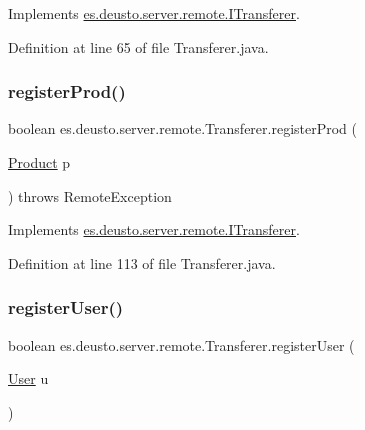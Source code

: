 Implements \hyperlink{interfacees_1_1deusto_1_1server_1_1remote_1_1_i_transferer_ab767521556fc61bc5a39306080f00cae}{es.\+deusto.\+server.\+remote.\+I\+Transferer}.



Definition at line 65 of file Transferer.\+java.

\mbox{\label{classes_1_1deusto_1_1server_1_1remote_1_1_transferer_a64c1f3b57b74106df83335b124937afe}} 
\subsubsection{\texorpdfstring{register\+Prod()}{registerProd()}}
{\footnotesize\ttfamily boolean es.\+deusto.\+server.\+remote.\+Transferer.\+register\+Prod (\begin{DoxyParamCaption}\item[{\hyperlink{classes_1_1deusto_1_1server_1_1db_1_1data_1_1_product}{Product}}]{p }\end{DoxyParamCaption}) throws Remote\+Exception}



Implements \hyperlink{interfacees_1_1deusto_1_1server_1_1remote_1_1_i_transferer_a06629c7021aae4d2ce1a449726102ded}{es.\+deusto.\+server.\+remote.\+I\+Transferer}.



Definition at line 113 of file Transferer.\+java.

\mbox{\label{classes_1_1deusto_1_1server_1_1remote_1_1_transferer_a80e2dd7db595bdd8d39969e5d0e8ae7b}} 
\subsubsection{\texorpdfstring{register\+User()}{registerUser()}}
{\footnotesize\ttfamily boolean es.\+deusto.\+server.\+remote.\+Transferer.\+register\+User (\begin{DoxyParamCaption}\item[{\hyperlink{classes_1_1deusto_1_1server_1_1db_1_1data_1_1_user}{User}}]{u }\end{DoxyParamCaption})}



